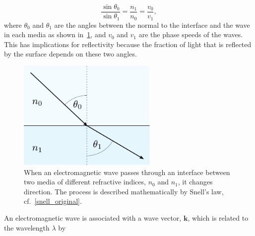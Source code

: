 \documentclass[10pt,twoside, b5paper,pdftex]{report}
\begin{document}
\begin{equation}\label{snell_original}
\frac{\sin{\theta_{0}}}{\sin{\theta_{1}}} = \frac{n_{1}}{n_{0}} = \frac{v_{0}}{v_{1}} ,
\end{equation}
%
where $\theta_{0}$ and $\theta_{1}$ are the angles between the normal to the interface and the wave in each media as shown in~\cref{fig:snell}, and $v_{0}$ and $v_{1}$ are the phase speeds of the waves. This has implications for reflectivity because the fraction of light that is reflected by the surface depends on these two angles.
\begin{figure}[htbp]
	\begin{center}
		\includegraphics[width=0.6\textwidth]{figures/snell.pdf}		
	\end{center}
	\caption{When an electromagnetic wave passes through an interface between two media of different refractive indices, $n_0$ and $n_1$, it changes direction. The process is described mathematically by Snell's law, cf.~\cref{snell_original}.\label{fig:snell}}
\end{figure}

An electromagnetic wave is associated with a wave vector, $\mathbf{k}$, which is related to the wavelength $\lambda$ by 
\end{document}

